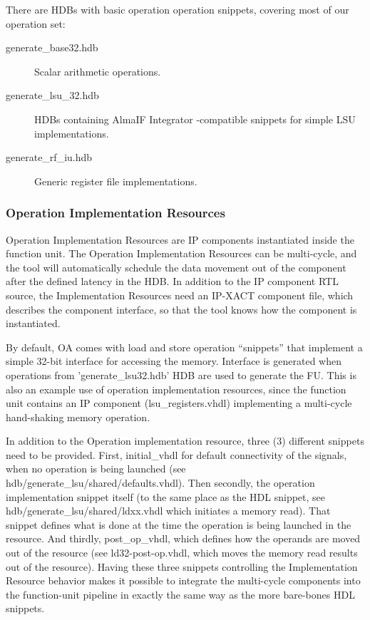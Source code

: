 \documentclass[a4paper,twoside]{tceusermanual}
\begin{document}
There are HDBs with basic operation operation snippets, covering most of our
operation set:
\begin{description}
  \item[generate\_base32.hdb] Scalar arithmetic operations.
  \item[generate\_lsu\_32.hdb] HDBs containing AlmaIF Integrator -compatible
    snippets for simple LSU implementations.
  \item[generate\_rf\_iu.hdb] Generic register file implementations.
\end{description}



\subsubsection{Operation Implementation Resources}

Operation Implementation Resources are IP components instantiated inside the
function unit. The Operation Implementation Resources can be multi-cycle,
and the tool will automatically schedule the data movement out of the
component after the defined latency in the HDB.
In addition to the IP component RTL source, the Implementation
Resources need an IP-XACT component file, which describes the component
interface, so that the tool knows how the component is instantiated.



By default, OA comes with load and store operation ``snippets'' that
implement a simple 32-bit interface for accessing the
memory. Interface is generated when operations from
'generate\_lsu32.hdb' HDB are used to generate the FU.
This is also an example use of operation implementation resources, since
the function unit contains an IP component (lsu\_registers.vhdl)
implementing a multi-cycle hand-shaking memory operation.


In addition to the Operation implementation resource, three (3) different
snippets need to be provided. First, initial\_vhdl for default
connectivity of the signals, when no operation is being launched
(see hdb/generate\_lsu/shared/defaults.vhdl). Then secondly, the operation
implementation snippet itself (to the same place as the HDL snippet, see
hdb/generate\_lsu/shared/ldxx.vhdl which initiates a memory read). That
snippet defines what is done at the time the operation is being launched in
the resource. And thirdly, post\_op\_vhdl, which defines how the operands are
moved out of the resource (see ld32-post-op.vhdl, which moves the memory read
results out of the resource).
Having these three snippets controlling the Implementation Resource behavior
makes it possible to integrate the multi-cycle components into the
function-unit pipeline in exactly the same way as the more bare-bones HDL
snippets.
\end{document}

